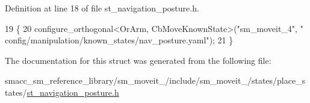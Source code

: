 Definition at line 18 of file st\+\_\+navigation\+\_\+posture.\+h.


\begin{DoxyCode}
19             \{
20                 configure\_orthogonal<OrArm, CbMoveKnownState>(\textcolor{stringliteral}{"sm\_moveit\_4"}, \textcolor{stringliteral}{"
      config/manipulation/known\_states/nav\_posture.yaml"});
21             \}
\end{DoxyCode}


The documentation for this struct was generated from the following file\+:\begin{DoxyCompactItemize}
\item 
smacc\+\_\+sm\+\_\+reference\+\_\+library/sm\+\_\+moveit\+\_/include/sm\+\_\+moveit\+\_/states/place\+\_\+states/\hyperlink{4_2include_2sm__moveit__4_2states_2place__states_2st__navigation__posture_8h}{st\+\_\+navigation\+\_\+posture.\+h}\end{DoxyCompactItemize}
